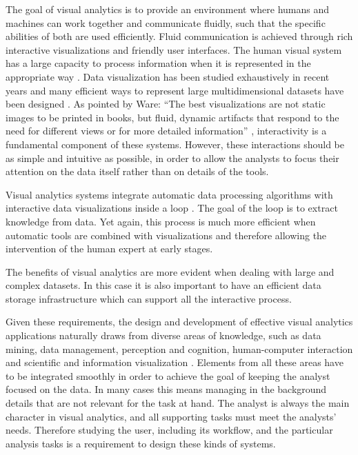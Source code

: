 The goal of visual analytics is to provide an environment where humans and machines can work
together and communicate fluidly, such that the specific abilities of both are used
efficiently. Fluid communication is achieved through rich interactive
visualizations and friendly user interfaces.
The human visual system has a large capacity to process information when it is
represented in the appropriate way \autocite{ware_information_2004}. Data visualization has been studied
exhaustively in recent years and many efficient ways to represent large multidimensional
datasets have been designed \autocite{heer_tour_2010}. As
pointed by Ware: "`The best visualizations are not static images to be printed in books, but fluid,
dynamic artifacts that respond to the need for different views or for more detailed
information"' \autocite{ware_information_2004}, interactivity is a fundamental component of these systems. 
However,  these interactions should be
as simple and intuitive as possible, in order to allow the analysts to focus their attention on the
data itself \autocite{spence_information_2007} rather than on details of the tools. 

Visual analytics systems integrate automatic data processing algorithms with interactive data visualizations
inside a loop \autocite{keim_mastering_2010}. The goal of the loop is to extract knowledge from data. Yet again, this process
is much more efficient when automatic tools are combined with visualizations and therefore allowing the intervention of the
human expert at early stages. 

The benefits of visual analytics are more evident when dealing with large and complex datasets. In this case it is also important
to have an efficient data storage infrastructure which can support all the interactive process. 

Given these requirements, the design and development of effective visual analytics
applications naturally draws from diverse areas of knowledge, such as data mining, data management, perception and cognition, human-computer interaction and scientific and information visualization \autocite{keim_visual_2008}. Elements from all these areas have to be integrated smoothly in order to achieve the goal of keeping the analyst focused on the data. In many cases this means managing in the background details that are not relevant for the task at hand. The analyst is always the main character in visual analytics, and all supporting tasks must meet the analysts' needs. Therefore studying the user, including its workflow, and the particular analysis tasks is a requirement to design these kinds of systems. 


